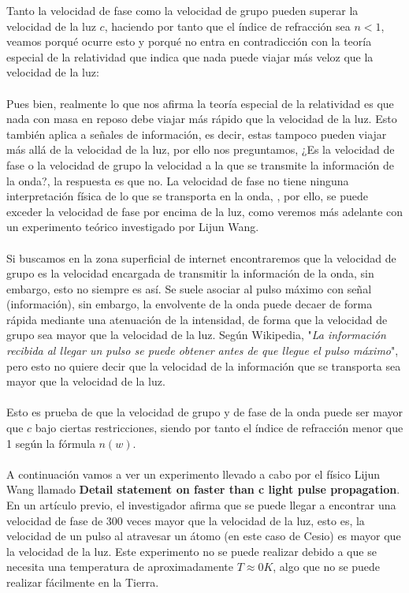 \documentclass[a4paper]{article}
\begin{document}
Tanto la velocidad de fase como la velocidad de grupo pueden superar la velocidad de la luz $c$, haciendo por tanto que el índice de refracción sea $n<1$, veamos porqué ocurre esto y porqué no entra en contradicción con la teoría especial de la relatividad que indica que nada puede viajar más veloz que la velocidad de la luz:\\
\\
Pues bien, realmente lo que nos afirma la teoría especial de la relatividad es que nada con masa en reposo debe viajar más rápido que la velocidad de la luz. Esto también aplica a señales de información, es decir, estas tampoco pueden viajar más allá de la velocidad de la luz, por ello nos preguntamos, ¿Es la velocidad de fase o la velocidad de grupo la velocidad a la que se transmite la información de la onda?, la respuesta es que no. La velocidad de fase no tiene ninguna interpretación física de lo que se transporta en la onda, , por ello, se puede exceder la velocidad de fase por encima de la luz, como veremos más adelante con un experimento teórico investigado por Lijun Wang. \\
\\
Si buscamos en la zona superficial de internet encontraremos que la velocidad de grupo es la velocidad encargada de transmitir la información de la onda, sin embargo, esto no siempre es así. Se suele asociar al pulso máximo con señal (información), sin embargo, la envolvente de la onda puede decaer de forma rápida mediante una atenuación de la intensidad, de forma que la velocidad de grupo sea mayor que la velocidad de la luz. Según Wikipedia, "\textit{La información recibida al llegar un pulso se puede obtener  antes de que llegue el pulso máximo}", pero esto no quiere decir que la velocidad de la información que se transporta sea mayor que la velocidad de la luz.\\
\\
Esto es prueba de que la velocidad de grupo y de fase de la onda puede ser mayor que $c$ bajo ciertas restricciones, siendo por tanto el índice de refracción menor que 1 según la fórmula $n\left( w \right) $. \\
\\
A continuación vamos a ver un experimento llevado a cabo por el físico Lijun Wang llamado \textbf{Detail statement on faster than c light pulse propagation}. En un artículo previo, el investigador afirma que se puede llegar a encontrar una velocidad de fase de 300 veces mayor que la velocidad de la luz, esto es, la velocidad de un pulso al atravesar un átomo (en este caso de Cesio) es mayor que la velocidad de la luz. Este experimento no se puede realizar debido a que se necesita una temperatura de aproximadamente $T\approx 0 K$, algo que no se puede realizar fácilmente en la Tierra.\\
\end{document}
